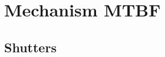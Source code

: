 \documentclass{article}
\begin{document}
%
%
%
%
%
%
%

\clearpage
\section{Mechanism MTBF}

\subsection{Shutters}
\end{document}
